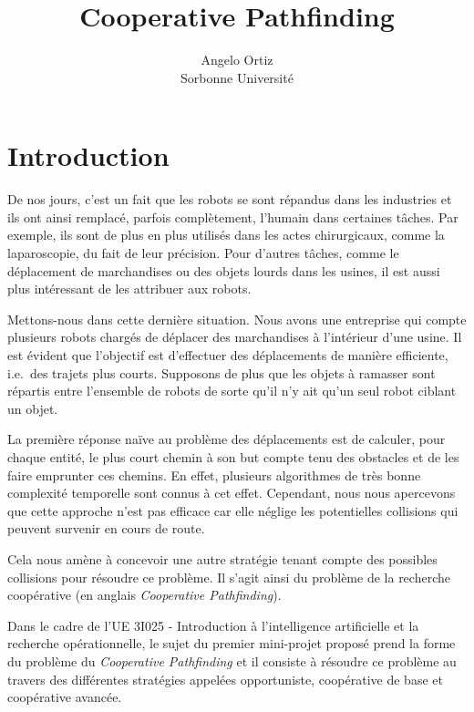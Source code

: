 \documentclass[letterpaper]{article}
\begin{document}
\title{Cooperative Pathfinding}

\author{Angelo Ortiz \\
Sorbonne Universit\'e}


\maketitle

\section{Introduction}
De nos jours, c'est un fait que les robots se sont r\'epandus dans les industries et ils ont ainsi remplac\'e, parfois compl\`etement, l'humain dans certaines t\^aches. 
Par exemple, ils sont de plus en plus utilis\'es dans les actes chirurgicaux, comme la laparoscopie, du fait de leur pr\'ecision.
Pour d'autres t\^aches, comme le d\'eplacement de marchandises ou des objets lourds dans les usines, il est aussi plus int\'eressant de les attribuer aux robots.

Mettons-nous dans cette derni\`ere situation.
Nous avons une entreprise qui compte plusieurs robots charg\'es de d\'eplacer des marchandises \`a l'int\'erieur d'une usine. 
Il est \'evident que l'objectif est d'effectuer des d\'eplacements de mani\`ere efficiente, i.e.\ des trajets plus courts. 
Supposons de plus que les objets \`a ramasser sont r\'epartis entre l'ensemble de robots de sorte qu'il n'y ait qu'un seul robot ciblant un objet.

La premi\`ere r\'eponse na\"ive au probl\`eme des d\'eplacements est de calculer, pour chaque entit\'e, le plus court chemin \`a son but compte tenu des obstacles et de les faire emprunter ces chemins.
En effet, plusieurs algorithmes de tr\`es bonne complexit\'e temporelle  sont connus \`a cet effet.
Cependant, nous nous apercevons que cette approche n'est pas efficace car elle n\'eglige les potentielles collisions qui peuvent survenir en cours de route.

Cela nous am\`ene \`a concevoir une autre strat\'egie tenant compte des possibles collisions pour r\'esoudre ce probl\`eme.
Il s'agit ainsi du probl\`eme de la recherche coop\'erative (en anglais \textit{Cooperative Pathfinding}).

Dans le cadre de l'UE 3I025 - Introduction \`a l'intelligence artificielle et la recherche op\'erationnelle, le sujet du premier mini-projet propos\'e prend la forme du probl\`eme du \textit{Cooperative Pathfinding} et il consiste \`a r\'esoudre ce probl\`eme au travers des diff\'erentes strat\'egies appel\'ees opportuniste, coop\'erative de base et coop\'erative avanc\'ee.
\end{document}
